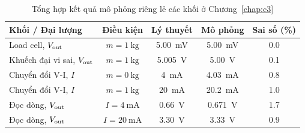\begin{table}[H]
    \centering
    \caption{Tổng hợp kết quả mô phỏng riêng lẻ các khối ở Chương~\ref{chap:c3}}
    \label{tab:c3:tong-ket}
    \renewcommand{\arraystretch}{1.3}
    \begin{tabularx}{\textwidth}{|X|c|c|c|c|}
        \hline
        \textbf{Khối / Đại lượng} & \textbf{Điều kiện} & \textbf{Lý thuyết} & \textbf{Mô phỏng} & \textbf{Sai số (\unit{\percent})} \\ \hline
        Load cell, $V_{\mathrm{out}}$          & $m = \qty{1}{\kilo\gram}$ & \qty{5.00}{\milli\volt}  & \qty{5.00}{\milli\volt}  & 0.0 \\ \hline
        Khuếch đại vi sai, $V_{\mathrm{out}}$  & $m = \qty{1}{\kilo\gram}$ & \qty{5.005}{\volt}       & \qty{5.00}{\volt}        & 0.1 \\ \hline
        Chuyển đổi V-I, $I$         & $m = \qty{0}{\kilo\gram}$ & \qty{4}{\milli\ampere}   & \qty{4.03}{\milli\ampere} & 0.8 \\ \hline
        Chuyển đổi V-I, $I$         & $m = \qty{1}{\kilo\gram}$ & \qty{20}{\milli\ampere}  & \qty{20.2}{\milli\ampere} & 1.0 \\ \hline
        Đọc dòng, $V_{\mathrm{out}}$           & $I = \qty{4}{\milli\ampere}$  & \qty{0.66}{\volt}    & \qty{0.671}{\volt}       & 1.7 \\ \hline
        Đọc dòng, $V_{\mathrm{out}}$           & $I = \qty{20}{\milli\ampere}$ & \qty{3.30}{\volt}    & \qty{3.33}{\volt}        & 0.9 \\ \hline
    \end{tabularx}
\end{table}

